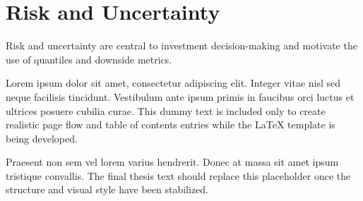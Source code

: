 \section{Risk and Uncertainty}

Risk and uncertainty are central to investment decision-making and motivate the use of quantiles and downside metrics.

Lorem ipsum dolor sit amet, consectetur adipiscing elit. Integer vitae nisl sed neque facilisis tincidunt. Vestibulum ante ipsum primis in faucibus orci luctus et ultrices posuere cubilia curae. This dummy text is included only to create realistic page flow and table of contents entries while the LaTeX template is being developed.

Praesent non sem vel lorem varius hendrerit. Donec at massa sit amet ipsum tristique convallis. The final thesis text should replace this placeholder once the structure and visual style have been stabilized.


